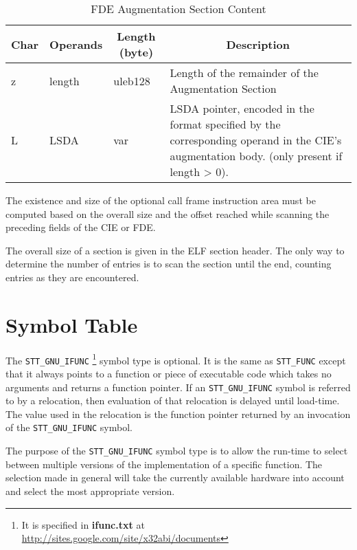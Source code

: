 \begin{table}[H]
\Hrule
\caption{FDE Augmentation Section Content}
\label{format-fdeaug}
\begin{center}
\begin{tabular}{l|p{6em}|l|p{16em}}
  \multicolumn{1}{c}{Char}
         & \multicolumn{1}{c}{Operands}
         & \multicolumn{1}{c}{Length (byte)}
         & \multicolumn{1}{c}{Description} \\ \hline
  z & length & uleb128 & Length of the remainder of the
                                        Augmentation Section \\
  L & LSDA & var & LSDA pointer, encoded in the
                   format specified by the
                   corresponding operand in the CIE's
                   augmentation body. (only present if length > 0). \\
\hline
    \end{tabular}
  \end{center}
\Hrule
\end{table}
The existence and size of the optional call frame instruction area must
be computed
based on the overall size and the offset reached while scanning the
preceding fields of the CIE or FDE.

The overall size of a  section is given in the ELF section
header.  The only way to determine the number of entries is to scan
the section until the end, counting entries as they are encountered.

\section{Symbol Table}

The \texttt{STT_GNU_IFUNC}
\footnote{It is specified in {\bf ifunc.txt}
at \url{http://sites.google.com/site/x32abi/documents}}
symbol type is optional. It is the same as
\texttt{STT_FUNC} except that it always points to a function or piece of
executable code which takes no arguments and returns a function pointer.
If an \texttt{STT_GNU_IFUNC} symbol is referred to by a relocation, then
evaluation of that relocation is delayed until load-time.  The value
used in the relocation is the function pointer returned by an invocation
of the \texttt{STT_GNU_IFUNC} symbol.
 
The purpose of the \texttt{STT_GNU_IFUNC} symbol type is to allow the
run-time to select between multiple versions of the implementation of
a specific function.  The selection made in general will take the
currently available hardware into account and select the most
appropriate version.

